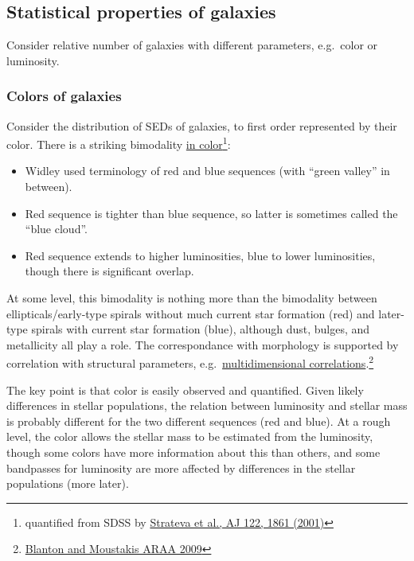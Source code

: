 \documentclass{article}
\begin{document}
\subsection{Statistical properties of galaxies}
Consider relative number of galaxies with different parameters,
e.g.\ color or luminosity.

\subsubsection{Colors of galaxies}
Consider the distribution of SEDs of galaxies, to first order represented by
their color. There is a striking bimodality \href{http://astronomy.nmsu.edu/holtz/a555/images/strateva.htm}
{in color}\footnote{quantified from SDSS by \href{http://adsabs.harvard.edu/cgi-bin/bib_query?2001AJ....122.1861S}
{Strateva et al., AJ 122, 1861 (2001)}}:
\begin{itemize}
    \item Widley used terminology of red and blue sequences
        (with ``green valley'' in between).
    \item Red sequence is tighter than blue sequence, so latter is
        sometimes called the ``blue cloud''.
    \item Red sequence extends to higher luminosities, blue to lower
        luminosities, though there is significant overlap.
\end{itemize}
At some level, this bimodality is nothing more than the bimodality between
ellipticals/early-type spirals without much current star formation (red) and
later-type spirals with current star formation (blue), although dust, bulges,
and metallicity all play a role. The correspondance with morphology is
supported by correlation with structural parameters, e.g.\ \href{http://astronomy.nmsu.edu/holtz/a555/resources/blanton_araa_correlations.htm}
{multidimensional correlations}.\footnote{\href{http://adsabs.harvard.edu/abs/2009ARA\%26A..47..159B}
    {Blanton and Moustakis ARAA 2009}}

The key point is that color is easily observed and quantified. Given likely
differences in stellar populations, the relation between luminosity and stellar
mass is probably different for the two different sequences (red and blue). At a
rough level, the color allows the stellar mass to be estimated from the
luminosity, though some colors have more information about this than others,
and some bandpasses for luminosity are more affected by differences in the
stellar populations (more later).
\end{document}
